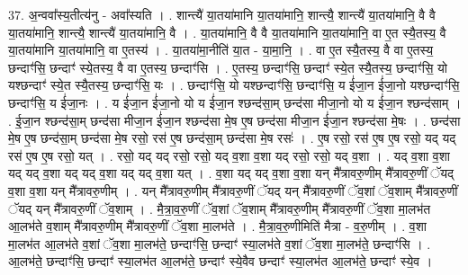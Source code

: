 \documentclass[17pt]{extarticle}
\begin{document}
37. अ॒न्ववा᳚स्य॒तीत्य॑नु - अवा᳚स्यति । . शान्त्यै॑ या॒तया॑मानि या॒तया॑मानि॒ शान्त्यै॒ शान्त्यै॑ या॒तया॑मानि॒ वै वै या॒तया॑मानि॒ शान्त्यै॒ शान्त्यै॑ या॒तया॑मानि॒ वै । . या॒तया॑मानि॒ वै वै या॒तया॑मानि या॒तया॑मानि॒ वा ए॒त स्यै॒तस्य॒ वै या॒तया॑मानि या॒तया॑मानि॒ वा ए॒तस्य॑ । . या॒तया॑मा॒नीति॑ या॒त - या॒मा॒नि॒ । . वा ए॒त स्यै॒तस्य॒ वै वा ए॒तस्य॒ छन्दाꣳ॑सि॒ छन्दाꣳ॑ स्ये॒तस्य॒ वै वा ए॒तस्य॒ छन्दाꣳ॑सि । . ए॒तस्य॒ छन्दाꣳ॑सि॒ छन्दाꣳ॑ स्ये॒त स्यै॒तस्य॒ छन्दाꣳ॑सि॒ यो यश्छन्दाꣳ॑ स्ये॒त स्यै॒तस्य॒ छन्दाꣳ॑सि॒ यः । . छन्दाꣳ॑सि॒ यो यश्छन्दाꣳ॑सि॒ छन्दाꣳ॑सि॒ य ई॑जा॒न ई॑जा॒नो यश्छन्दाꣳ॑सि॒ छन्दाꣳ॑सि॒ य ई॑जा॒नः । . य ई॑जा॒न ई॑जा॒नो यो य ई॑जा॒न श्छन्द॑सा॒म् छन्द॑सा मीजा॒नो यो य ई॑जा॒न श्छन्द॑साम् । . ई॒जा॒न श्छन्द॑सा॒म् छन्द॑सा मीजा॒न ई॑जा॒न श्छन्द॑सा मे॒ष ए॒ष छन्द॑सा मीजा॒न ई॑जा॒न श्छन्द॑सा मे॒षः । . छन्द॑सा मे॒ष ए॒ष छन्द॑सा॒म् छन्द॑सा मे॒ष रसो॒ रस॑ ए॒ष छन्द॑सा॒म् छन्द॑सा मे॒ष रसः॑ । . ए॒ष रसो॒ रस॑ ए॒ष ए॒ष रसो॒ यद् यद् रस॑ ए॒ष ए॒ष रसो॒ यत् । . रसो॒ यद् यद् रसो॒ रसो॒ यद् व॒शा व॒शा यद् रसो॒ रसो॒ यद् व॒शा । . यद् व॒शा व॒शा यद् यद् व॒शा यद् यद् व॒शा यद् यद् व॒शा यत् । . व॒शा यद् यद् व॒शा व॒शा यन् मै᳚त्रावरु॒णीम् मै᳚त्रावरु॒णीं ॅयद् व॒शा व॒शा यन् मै᳚त्रावरु॒णीम् । . यन् मै᳚त्रावरु॒णीम् मै᳚त्रावरु॒णीं ॅयद् यन् मै᳚त्रावरु॒णीं ॅव॒शां ॅव॒शाम् मै᳚त्रावरु॒णीं ॅयद् यन् मै᳚त्रावरु॒णीं ॅव॒शाम् । . मै॒त्रा॒व॒रु॒णीं ॅव॒शां ॅव॒शाम् मै᳚त्रावरु॒णीम् मै᳚त्रावरु॒णीं ॅव॒शा मा॒लभ॑त आ॒लभ॑ते व॒शाम् मै᳚त्रावरु॒णीम् मै᳚त्रावरु॒णीं ॅव॒शा मा॒लभ॑ते । . मै॒त्रा॒व॒रु॒णीमिति॑ मैत्रा - व॒रु॒णीम् । . व॒शा मा॒लभ॑त आ॒लभ॑ते व॒शां ॅव॒शा मा॒लभ॑ते॒ छन्दाꣳ॑सि॒ छन्दाꣳ॑ स्या॒लभ॑ते व॒शां ॅव॒शा मा॒लभ॑ते॒ छन्दाꣳ॑सि । . आ॒लभ॑ते॒ छन्दाꣳ॑सि॒ छन्दाꣳ॑ स्या॒लभ॑त आ॒लभ॑ते॒ छन्दाꣳ॑ स्ये॒वैव छन्दाꣳ॑ स्या॒लभ॑त आ॒लभ॑ते॒ छन्दाꣳ॑ स्ये॒व । \newline
\end{document}
